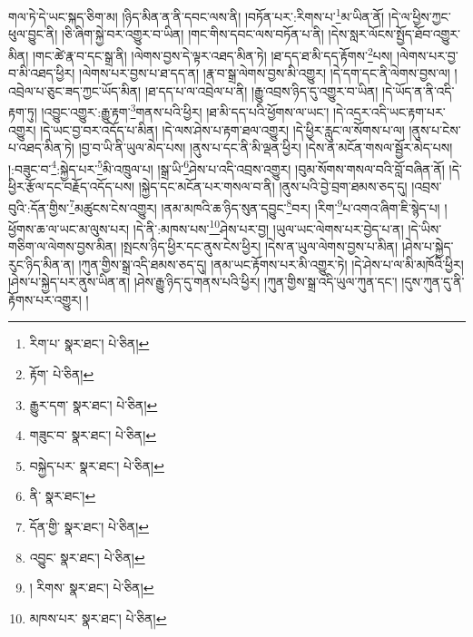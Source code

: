 གལ་ཏེ་དེ་ཡང་སྐད་ཅིག་མ། །ཉིད་མིན་ན་ནི་དབང་ལས་ནི། །བཏོན་པར་:རིགས་པ་\footnote{རིག་པ་  སྣར་ཐང་།  པེ་ཅིན། }མ་ཡིན་ནོ། །དེ་ལ་ཕྱིས་ཀྱང་ཕུལ་བྱུང་ནི། །ཅི་ཞིག་སྐྱེ་བར་འགྱུར་བ་ཡིན། །གང་གིས་དབང་ལས་བཏོན་པ་ནི། །དེས་སླར་ལོངས་སྤྱོད་ཐོབ་འགྱུར་མིན། །གང་ཚེ་རྣ་བ་དང་སྒྲ་ནི། །ལེགས་བྱས་དེ་ལྟར་འཐད་མིན་ཏེ། །ཐ་དད་ཐ་མི་དད་རྟོགས་\footnote{རྟོག་  པེ་ཅིན། }པས། །ལེགས་པར་བྱ་བ་མི་འཐད་ཕྱིར། །ལེགས་པར་བྱས་པ་ཐ་དད་ན། །རྣ་བ་སྒྲ་ལེགས་བྱས་མི་འགྱུར། །དེ་དག་དང་ནི་ལེགས་བྱས་ལ། །འབྲེལ་པ་ཅུང་ཟད་ཀྱང་ཡོད་མིན། །ཐ་དད་པ་ལ་འབྲེལ་པ་ནི། །རྒྱུ་འབྲས་ཉིད་དུ་འགྱུར་བ་ཡིན། །དེ་ཡོད་ན་ནི་འདི་རྟག་ཏུ། །འབྱུང་འགྱུར་:རྒྱུ་རྟག་\footnote{རྒྱུར་དག་  སྣར་ཐང་།  པེ་ཅིན། }གནས་པའི་ཕྱིར། །ཐ་མི་དད་པའི་ཕྱོགས་ལ་ཡང་། །དེ་འདྲར་འདི་ཡང་རྟག་པར་འགྱུར། །དེ་ཡང་བྱ་བར་འདོད་པ་མིན། །དེ་ལས་ཤེས་པ་རྟག་ཐལ་འགྱུར། །དེ་ཕྱིར་རླུང་ལ་སོགས་པ་ལ། །ནུས་པ་ངེས་པ་འཐད་མིན་ཏེ། །བྱ་བ་ཡི་ནི་ཡུལ་མེད་པས། །ནུས་པ་དང་ནི་མི་ལྡན་ཕྱིར། །དེས་ན་མངོན་གསལ་སྦྱོར་མེད་པས། །:བཟུང་བ་\footnote{གཟུང་བ་  སྣར་ཐང་།  པེ་ཅིན། }:སྐྱེད་པར་\footnote{བསྐྱེད་པར་  སྣར་ཐང་།  པེ་ཅིན། }མི་འཁྲུལ་པ། །སྒྲ་ཡི་\footnote{ནི་  སྣར་ཐང་། }ཤེས་པ་འདི་འབྲས་འགྱུར། །བུམ་སོགས་གསལ་བའི་བློ་བཞིན་ནོ། །དེ་ཕྱིར་རྩོལ་དང་བརྗོད་འདོད་པས། །སྐྱེད་དང་མངོན་པར་གསལ་བ་ནི། །ནུས་པའི་བྱེ་བྲག་ཐམས་ཅད་དུ། །འབྲས་བུའི་:དོན་གྱིས་\footnote{དོན་གྱི་  སྣར་ཐང་།  པེ་ཅིན། }མཚུངས་ངེས་འགྱུར། །ནམ་མཁའི་ཆ་ཉིད་སུན་དབྱུང་\footnote{འབྱུང་  སྣར་ཐང་།  པེ་ཅིན། }བར། །རིག་\footnote{། རིགས་  སྣར་ཐང་།  པེ་ཅིན། }པ་འགའ་ཞིག་ཇི་སྙེད་པ། །ཕྱོགས་ཆ་ལ་ཡང་མ་ལུས་པར། །དེ་ནི་:མཁས་པས་\footnote{མཁས་པར་  སྣར་ཐང་།  པེ་ཅིན། }ཤེས་པར་བྱ། །ཡུལ་ཡང་ལེགས་པར་བྱེད་པ་ན། །དེ་ཡིས་གཅིག་ལ་ལེགས་བྱས་མིན། །སྤངས་ཉིད་ཕྱིར་དང་ནུས་ངེས་ཕྱིར། །དེས་ན་ཡུལ་ལེགས་བྱས་པ་མིན། །ཤེས་པ་སྐྱེད་རུང་ཉིད་མིན་ན། །ཀུན་གྱིས་སྒྲ་འདི་ཐམས་ཅད་དུ། །ནམ་ཡང་རྟོགས་པར་མི་འགྱུར་ཏེ། །དེ་ཤེས་པ་ལ་མི་མཁོའི་ཕྱིར། །ཤེས་པ་སྐྱེད་པར་ནུས་ཡིན་ན། །ཤེས་རྒྱུ་ཉིད་དུ་གནས་པའི་ཕྱིར། །ཀུན་གྱིས་སྒྲ་འདི་ཡུལ་ཀུན་དང་། །དུས་ཀུན་དུ་ནི་རྟོགས་པར་འགྱུར། །
